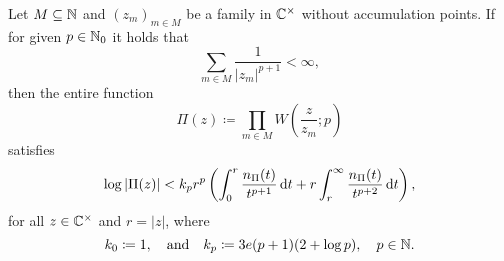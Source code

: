 \begin{lemma} \label{lem:canonical-product-estimate}
    Let $M \subseteq \mathbb{N}$ and $(z_m)_{m \in M}$ be a family in $\mathbb{C}^\times$ without accumulation points. If for given $p \in \mathbb{N}_0$ it holds that
    $$ \sum_{m \in M} \frac{1}{\vert z_m \vert^{p+1}} < \infty, $$
    then the entire function
    $$ \Pi(z) \coloneqq \prod_{m \in M} W \left( \frac{z}{z_m}; p \right) $$
    satisfies
    \begin{equation}
        \log \vert \Pi(z) \vert < k_p r^p \left( \int_0^r \frac{n_\Pi(t)}{t^{p+1}} \mathop{}\!\mathrm{d} t + r \int_r^\infty \frac{n_\Pi(t)}{t^{p+2}} \mathop{}\!\mathrm{d} t \right),
    \end{equation}
    for all $z \in \mathbb{C}^\times$ and $r = \vert z \vert$, where
    $$ k_0 \coloneqq 1, \quad \textrm{and} \quad k_p \coloneqq 3e(p+1)(2 + \log p), \quad p \in \mathbb{N}. $$
\end{lemma}

